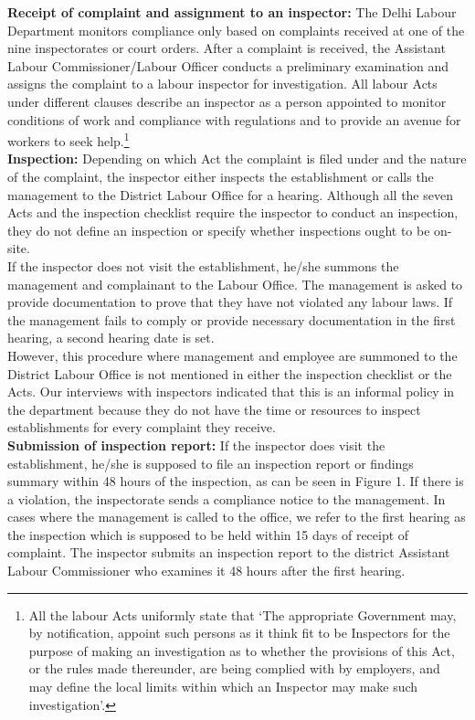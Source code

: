 \documentclass[a4paper, 12pt, twoside]{article}
\begin{document}
\textbf{Receipt of complaint and assignment to an inspector:} The Delhi Labour Department monitors compliance only based on complaints received at one of the nine inspectorates or court orders. After a complaint is received, the Assistant Labour Commissioner/Labour Officer conducts a preliminary examination and assigns the complaint to a labour inspector for investigation. All labour Acts under different clauses describe an inspector as a person appointed to monitor conditions of work and compliance with regulations and to provide an avenue for workers to seek help.\footnote{All the labour Acts uniformly state that ‘The appropriate Government may, by notification, appoint such persons as it think fit to be Inspectors for the purpose of making an investigation as to whether the provisions of this Act, or the rules made thereunder, are being complied with by employers, and may define the local limits within which an Inspector may make such investigation’.}\\

\textbf{Inspection:} Depending on which Act the complaint is filed under and the nature of the complaint, the inspector either inspects the establishment or calls the management to the District Labour Office for a hearing. Although all the seven Acts and the inspection checklist require the inspector to conduct an inspection, they do not define an inspection or specify whether inspections ought to be on-site. \\

If the inspector does not visit the establishment, he/she summons the management and complainant to the Labour Office. The management is asked to provide documentation to prove that they have not violated any labour laws. If the management fails to comply or provide necessary documentation in the first hearing, a second hearing date is set. \\

However, this procedure where management and employee are summoned to the District Labour Office is not mentioned in either the inspection checklist or the Acts. Our interviews with inspectors indicated that this is an informal policy in the department because they do not have the time or resources to inspect establishments for every complaint they receive. \\

\textbf{Submission of inspection report:} If the inspector does visit the establishment, he/she is supposed to file an inspection report or findings summary within 48 hours of the inspection, as can be seen in Figure 1. If there is a violation, the inspectorate sends a compliance notice to the management. In cases where the management is called to the office, we refer to the first hearing as the inspection which is supposed to be held within 15 days of receipt of complaint. The inspector submits an inspection report to the district Assistant Labour Commissioner who examines it 48 hours after the first hearing. \\
\end{document}
